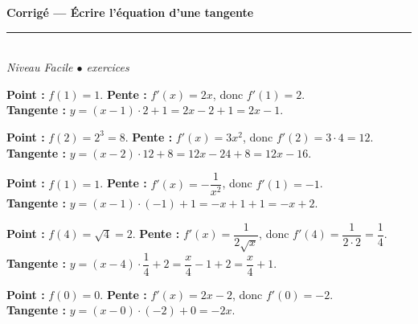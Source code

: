 \documentclass[11pt,a4paper]{article}
\begin{document}
\begin{center}
{\LARGE\bfseries\color{primarydark} Corrigé --- Écrire l'équation d'une tangente}\\[2pt]
{\color{primary}\rule{0.5\textwidth}{1.2pt}}\\[4pt]
{\small\itshape Niveau Facile \quad$\bullet$ exercices}
\end{center}
\vspace{2mm}

\begin{corr}[1 --- $f(x)=x^2$ en $x_0=1$]
\textbf{Point :} $f(1)=1$. \quad\textbf{Pente :} $f'(x)=2x$, donc $f'(1)=2$.\\
\textbf{Tangente :} $y=(x-1)\cdot 2+1=2x-2+1=\boxed{2x-1}$.
\end{corr}

\begin{corr}[2 --- $f(x)=x^3$ en $x_0=2$]
\textbf{Point :} $f(2)=2^3=8$. \quad\textbf{Pente :} $f'(x)=3x^2$, donc $f'(2)=3\cdot 4=12$.\\
\textbf{Tangente :} $y=(x-2)\cdot 12+8=12x-24+8=\boxed{12x-16}$.
\end{corr}

\begin{corr}[3 --- $f(x)=1/x$ en $x_0=1$]
\textbf{Point :} $f(1)=1$. \quad\textbf{Pente :} $f'(x)=-\dfrac{1}{x^2}$, donc $f'(1)=-1$.\\
\textbf{Tangente :} $y=(x-1)\cdot(-1)+1=-x+1+1=\boxed{-x+2}$.
\end{corr}

\begin{corr}[4 --- $f(x)=\sqrt{x}$ en $x_0=4$]
\textbf{Point :} $f(4)=\sqrt{4}=2$. \quad\textbf{Pente :} $f'(x)=\dfrac{1}{2\sqrt{x}}$, donc $f'(4)=\dfrac{1}{2\cdot 2}=\dfrac14$.\\
\textbf{Tangente :} $y=(x-4)\cdot\dfrac14+2=\dfrac{x}{4}-1+2=\boxed{\dfrac{x}{4}+1}$.
\end{corr}

\begin{corr}[5 --- $f(x)=x^2-2x$ en $x_0=0$]
\textbf{Point :} $f(0)=0$. \quad\textbf{Pente :} $f'(x)=2x-2$, donc $f'(0)=-2$.\\
\textbf{Tangente :} $y=(x-0)\cdot(-2)+0=\boxed{-2x}$.
\end{corr}
\end{document}
